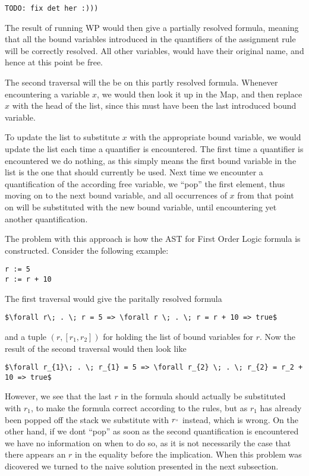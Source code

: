 \begin{lstlisting}
TODO: fix det her :)))
\end{lstlisting}

The result of running WP would then give a partially resolved formula, meaning that all the bound variables introduced in the quantifiers of the assignment rule will be correctly resolved. All other variables, would have their original name, and hence at this point be free.

The second traversal will the be on this partly resolved formula. Whenever encountering a variable $x$, we would then look it up in the Map, and then replace $x$ with the head of the list, since this must have been the last introduced bound variable.

To update the list to substitute $x$ with the appropriate bound variable, we would update the list each time a quantifier is encountered. 
The first time a quantifier is encountered we do nothing, as this simply means the first bound variable in the list is the one that should currently be used. 
Next time we encounter a quantification of the according free variable, we ``pop'' the first element, thus moving on to the next bound variable, and all occurrences of $x$ from that point on will be substituted with the new bound variable, until encountering yet another quantification.

The problem with this approach is how the AST for First Order Logic formula is constructed. Consider the following example:
\begin{lstlisting}
r := 5
r := r + 10
\end{lstlisting}
The first traversal would give the paritally resolved formula
\begin{lstlisting}[mathescape=true]
$\forall r\; . \; r = 5 => \forall r \; . \; r = r + 10 => true$
\end{lstlisting}
and a tuple $(r, [r_1, r_2])$ for holding the list of bound variables for $r$.
Now the result of the second traversal would then look like
\begin{lstlisting}[mathescape=true]
$\forall r_{1}\; . \; r_{1} = 5 => \forall r_{2} \; . \; r_{2} = r_2 + 10 => true$
\end{lstlisting}
However, we see that the last $r$ in the formula should actually be substituted with $r_1$, to make the formula correct according to the rules, but as $r_1$ has already been popped off the stack we substitute with $r_"$ instead, which is wrong.
On the other hand, if we dont ``pop'' as soon as the second quantification is encountered we have no information on when to do so, as it is not necessarily the case that there appears an $r$ in the equality before the implication. 
When this problem was dicovered we turned to the naive solution presented in the next subsection.

